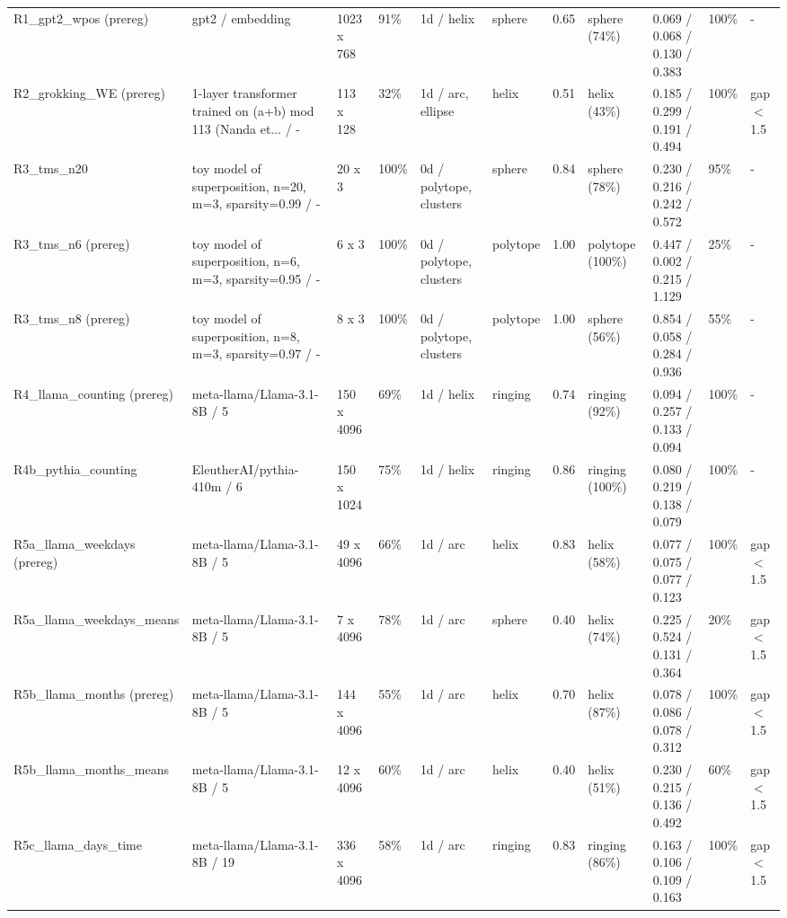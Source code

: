 \begin{tabular}{lllllllllll}
R1\_gpt2\_wpos (prereg) & gpt2 / embedding & 1023 x 768 & 91\% & 1d / helix & sphere & 0.65 & sphere (74\%) & 0.069 / 0.068 / 0.130 / 0.383 & 100\% & - \\
R2\_grokking\_WE (prereg) & 1-layer transformer trained on (a+b) mod 113 (Nanda et... / - & 113 x 128 & 32\% & 1d / arc, ellipse & helix & 0.51 & helix (43\%) & 0.185 / 0.299 / 0.191 / 0.494 & 100\% & gap$<$1.5 \\
R3\_tms\_n20 & toy model of superposition, n=20, m=3, sparsity=0.99 / - & 20 x 3 & 100\% & 0d / polytope, clusters & sphere & 0.84 & sphere (78\%) & 0.230 / 0.216 / 0.242 / 0.572 & 95\% & - \\
R3\_tms\_n6 (prereg) & toy model of superposition, n=6, m=3, sparsity=0.95 / - & 6 x 3 & 100\% & 0d / polytope, clusters & polytope & 1.00 & polytope (100\%) & 0.447 / 0.002 / 0.215 / 1.129 & 25\% & - \\
R3\_tms\_n8 (prereg) & toy model of superposition, n=8, m=3, sparsity=0.97 / - & 8 x 3 & 100\% & 0d / polytope, clusters & polytope & 1.00 & sphere (56\%) & 0.854 / 0.058 / 0.284 / 0.936 & 55\% & - \\
R4\_llama\_counting (prereg) & meta-llama/Llama-3.1-8B / 5 & 150 x 4096 & 69\% & 1d / helix & ringing & 0.74 & ringing (92\%) & 0.094 / 0.257 / 0.133 / 0.094 & 100\% & - \\
R4b\_pythia\_counting & EleutherAI/pythia-410m / 6 & 150 x 1024 & 75\% & 1d / helix & ringing & 0.86 & ringing (100\%) & 0.080 / 0.219 / 0.138 / 0.079 & 100\% & - \\
R5a\_llama\_weekdays (prereg) & meta-llama/Llama-3.1-8B / 5 & 49 x 4096 & 66\% & 1d / arc & helix & 0.83 & helix (58\%) & 0.077 / 0.075 / 0.077 / 0.123 & 100\% & gap$<$1.5 \\
R5a\_llama\_weekdays\_means & meta-llama/Llama-3.1-8B / 5 & 7 x 4096 & 78\% & 1d / arc & sphere & 0.40 & helix (74\%) & 0.225 / 0.524 / 0.131 / 0.364 & 20\% & gap$<$1.5 \\
R5b\_llama\_months (prereg) & meta-llama/Llama-3.1-8B / 5 & 144 x 4096 & 55\% & 1d / arc & helix & 0.70 & helix (87\%) & 0.078 / 0.086 / 0.078 / 0.312 & 100\% & gap$<$1.5 \\
R5b\_llama\_months\_means & meta-llama/Llama-3.1-8B / 5 & 12 x 4096 & 60\% & 1d / arc & helix & 0.40 & helix (51\%) & 0.230 / 0.215 / 0.136 / 0.492 & 60\% & gap$<$1.5 \\
R5c\_llama\_days\_time & meta-llama/Llama-3.1-8B / 19 & 336 x 4096 & 58\% & 1d / arc & ringing & 0.83 & ringing (86\%) & 0.163 / 0.106 / 0.109 / 0.163 & 100\% & gap$<$1.5 \\

\end{tabular}
